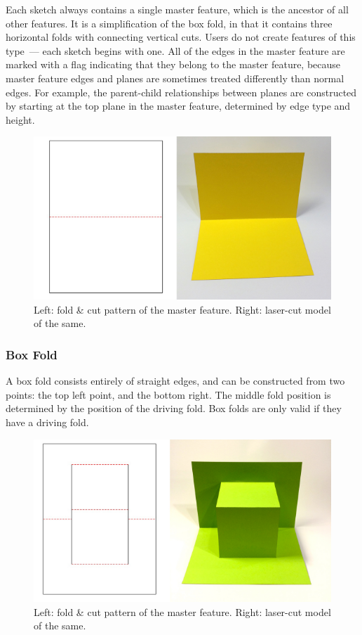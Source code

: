 Each sketch always contains a single master feature, which is the
ancestor of all other features. It is a simplification of the box fold,
in that it contains three horizontal folds with connecting vertical
cuts. Users do not create features of this type~--- each sketch begins
with one. All of the edges in the master feature are marked with a flag
indicating that they belong to the master feature, because master
feature edges and planes are sometimes treated differently than normal
edges. For example, the parent-child relationships between planes are
constructed by starting at the top plane in the master feature,
determined by edge type and height.

\begin{figure}[htbp]
\centering
\includegraphics{figures/33_UI_Interface_Data_Structures/mastercard.pdf}
\caption{Left: fold \& cut pattern of the master feature. Right:
laser-cut model of the same.}
\end{figure}

\subsubsection{Box Fold}\label{box-fold}

A box fold consists entirely of straight edges, and can be constructed
from two points: the top left point, and the bottom right. The middle
fold position is determined by the position of the driving fold. Box
folds are only valid if they have a driving fold.

\begin{figure}[htbp]
\centering
\includegraphics{figures/33_UI_Interface_Data_Structures/box.pdf}
\caption{Left: fold \& cut pattern of the master feature. Right:
laser-cut model of the same.}
\end{figure}

